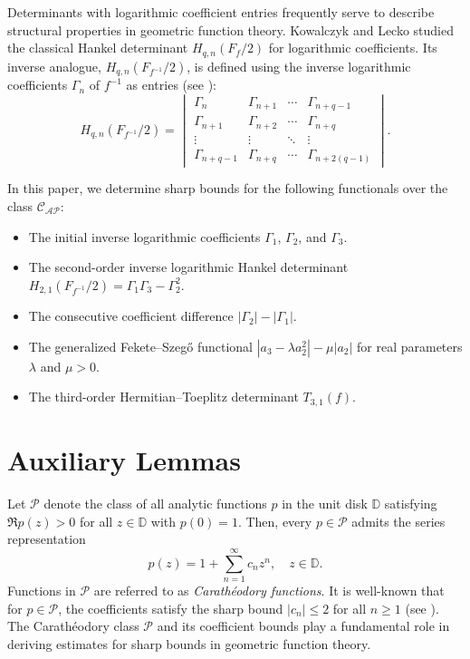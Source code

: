 \documentclass[11pt]{article}
\numberwithin{equation}{section}
\begin{document}
Determinants with logarithmic coefficient entries frequently serve to describe structural properties in geometric function theory. Kowalczyk and Lecko \cite{12,15} studied the classical Hankel determinant $H_{q,n}(F_f/2)$ for logarithmic coefficients. Its inverse analogue, $H_{q,n}(F_{f^{-1}}/2)$, is defined using the inverse logarithmic coefficients $\Gamma_n$ of $f^{-1}$ as entries (see \cite{16}):
\[
H_{q,n}\left(F_{f^{-1}}/2\right)
=
\begin{vmatrix}
\Gamma_n & \Gamma_{n+1} & \cdots & \Gamma_{n+q-1} \\
\Gamma_{n+1} & \Gamma_{n+2} & \cdots & \Gamma_{n+q} \\
\vdots & \vdots & \ddots & \vdots \\
\Gamma_{n+q-1} & \Gamma_{n+q} & \cdots & \Gamma_{n+2(q-1)}
\end{vmatrix}.
\]

In this paper, we determine sharp bounds for the following functionals over the class $\mathcal{C}_{\mathcal{AP}}$:
\begin{itemize}
\item The initial inverse logarithmic coefficients $\Gamma_1$, $\Gamma_2$, and $\Gamma_3$.
\item The second-order inverse logarithmic Hankel determinant $H_{2,1}(F_{f^{-1}}/2) = \Gamma_1\Gamma_3-\Gamma_2^2$.
\item The consecutive coefficient difference $|\Gamma_2|-|\Gamma_1|$.
\item The generalized Fekete--Szeg\H{o} functional $|a_3 - \lambda a_2^2| - \mu |a_2|$ for real parameters $\lambda$ and $\mu > 0$.
\item The third-order Hermitian--Toeplitz determinant $T_{3,1}(f)$.
\end{itemize}

\section{Auxiliary Lemmas}
Let $\mathcal{P}$ denote the class of all analytic functions $p$ in the unit disk $\mathbb{D}$ satisfying $\Re p(z) > 0$ for all $z \in \mathbb{D}$ with $p(0) = 1$. Then, every $p \in \mathcal{P}$ admits the series representation
\begin{equation}\label{p1}
p(z) = 1 + \sum_{n=1}^{\infty} c_n z^n, \quad z \in \mathbb{D}.
\end{equation}
Functions in $\mathcal{P}$ are referred to as \emph{Carath\'{e}odory functions}. It is well-known that for $p \in \mathcal{P}$, the coefficients satisfy the sharp bound $|c_n| \leq 2$ for all $n \geq 1$ (see \cite{PLD1}). The Carath\'{e}odory class $\mathcal{P}$ and its coefficient bounds play a fundamental role in deriving estimates for sharp bounds in geometric function theory.
\end{document}
